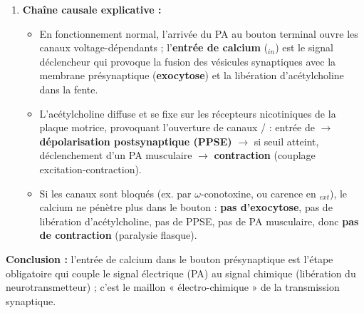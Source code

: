 \documentclass[11pt]{article}
\begin{document}
\begin{exoresolu}
\begin{enumerate}
\item \textbf{Chaîne causale explicative :}
\begin{itemize}
\item En fonctionnement normal, l'arrivée du PA au bouton terminal ouvre les canaux  voltage-dépendants ; l'\textbf{entrée de calcium} ($_{in}$) est le signal déclencheur qui provoque la fusion des vésicules synaptiques avec la membrane présynaptique (\textbf{exocytose}) et la libération d'acétylcholine dans la fente.
\item L'acétylcholine diffuse et se fixe sur les récepteurs nicotiniques de la plaque motrice, provoquant l'ouverture de canaux / : entrée de  $\rightarrow$ \textbf{dépolarisation postsynaptique (PPSE)} $\rightarrow$ si seuil atteint, déclenchement d'un PA musculaire $\rightarrow$ \textbf{contraction} (couplage excitation-contraction).
\item Si les canaux  sont bloqués (ex. par $\omega$-conotoxine, ou carence en $_{ext}$), le calcium ne pénètre plus dans le bouton : \textbf{pas d'exocytose}, pas de libération d'acétylcholine, pas de PPSE, pas de PA musculaire, donc \textbf{pas de contraction} (paralysie flasque).
\end{itemize}
\end{enumerate}
\textbf{Conclusion :} l'entrée de calcium dans le bouton présynaptique est l'étape obligatoire qui couple le signal électrique (PA) au signal chimique (libération du neurotransmetteur) ; c'est le maillon « électro-chimique » de la transmission synaptique.
\end{exoresolu}
\end{document}
